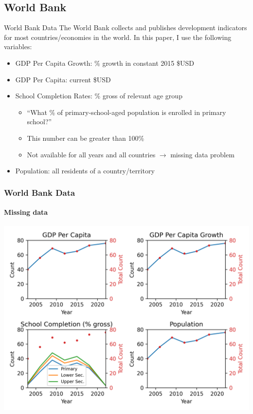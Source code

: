 \documentclass[10pt]{beamer}
\begin{document}
\subsection{World Bank}
\begin{frame}{World Bank Data}
    The World Bank collects and publishes development indicators for most countries/economies in the world. In this paper, I use the following variables:

    \begin{itemize}
        \item GDP Per Capita Growth: \% growth in constant 2015 \$USD
        \item GDP Per Capita: current \$USD
        \item School Completion Rates: \% gross of relevant age group
        \begin{itemize}
            \item ``What \% of primary-school-aged population is enrolled in primary school?''
            \item This number can be greater than 100\%
            \item Not available for all years and all countries $\rightarrow$ missing data problem
        \end{itemize}
        \item Population: all residents of a country/territory
    \end{itemize}
\end{frame}


\begin{frame}
    \frametitle{World Bank Data}
    \framesubtitle{Missing data}
    \centering
    \includegraphics[width=\textwidth]{../charts/wdi-count.png}
\end{frame}
\end{document}
